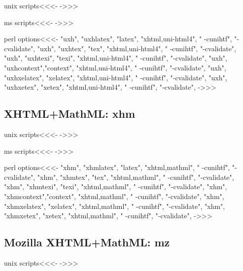 \documentclass{article}
\begin{document}
\<unix scripts\><<<-
->>>

\<ms scripts\><<<-
->>>

\<perl options\><<<-
 "uxh", "uxhlatex",  "latex",   "xhtml,uni-html4", " -cunihtf", "-cvalidate",
 "uxh", "uxhtex",    "tex",     "xhtml,uni-html4", " -cunihtf", "-cvalidate",
 "uxh", "uxhtexi",   "texi",    "xhtml,uni-html4", " -cunihtf", "-cvalidate",
 "uxh", "uxhcontext","context",  "xhtml,uni-html4", " -cunihtf", "-cvalidate",
 "uxh", "uxhxelatex",  "xelatex",   "xhtml,uni-html4", " -cunihtf", "-cvalidate",
 "uxh", "uxhxetex",    "xetex",     "xhtml,uni-html4", " -cunihtf", "-cvalidate",
->>>

\subsection{XHTML+MathML: xhm}

\<unix scripts\><<<-
->>>

\<ms scripts\><<<-
->>>


\<perl options\><<<-
 "xhm", "xhmlatex", "latex",  "xhtml,mathml", " -cunihtf", "-cvalidate",
 "xhm", "xhmtex",   "tex",    "xhtml,mathml", " -cunihtf", "-cvalidate",
 "xhm", "xhmtexi",  "texi",   "xhtml,mathml", " -cunihtf", "-cvalidate",
 "xhm", "xhmcontext","context", "xhtml,mathml", " -cunihtf", "-cvalidate",
 "xhm", "xhmxelatex", "xelatex",  "xhtml,mathml", " -cunihtf", "-cvalidate",
 "xhm", "xhmxetex",   "xetex",    "xhtml,mathml", " -cunihtf", "-cvalidate",
->>>


\subsection{Mozilla XHTML+MathML: mz}

\<unix scripts\><<<-
->>>
\end{document}
